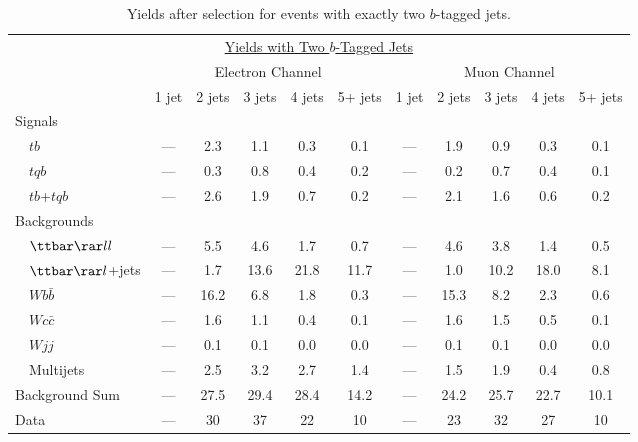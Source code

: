 \begin{table}[!h!tbp]
\begin{center}
\begin{minipage}{6.5in}
\begin{ruledtabular}
\begin{tabular}{l||ccccc|ccccc}
\multicolumn{11}{c}{\hspace{1in}\underline{Yields with Two $b$-Tagged Jets}} \vspace{0.1in} \\
& \multicolumn{5}{c|}{Electron Channel} & \multicolumn{5}{c}{Muon Channel} \\
                         & 1 jet & 2 jets & 3 jets & 4 jets & 5+ jets
                         & 1 jet & 2 jets & 3 jets & 4 jets & 5+ jets \\
\hline
Signals                  &      &       &       &       &      &      &       &       &       &       \\
~~$tb$                   &  --- &   2.3 &   1.1 &   0.3 &  0.1 &  --- &   1.9 &   0.9 &   0.3 &  0.1  \\
~~$tqb$                  &  --- &   0.3 &   0.8 &   0.4 &  0.2 &  --- &   0.2 &   0.7 &   0.4 &  0.1  \\
~~$tb$+$tqb$             &  --- &   2.6 &   1.9 &   0.7 &  0.2 &  --- &   2.1 &   1.6 &   0.6 &  0.2  \\
Backgrounds              &      &       &       &       &      &      &       &       &       &       \\
~~${\ttbar}{\rar}ll$     &  --- &   5.5 &   4.6 &   1.7 &  0.7 &  --- &   4.6 &   3.8 &   1.4 &  0.5  \\
~~${\ttbar}{\rar}l$+jets &  --- &   1.7 &  13.6 &  21.8 & 11.7 &  --- &   1.0 &  10.2 &  18.0 &  8.1  \\
~~$Wb\bar{b}$            &  --- &  16.2 &   6.8 &   1.8 &  0.3 &  --- &  15.3 &   8.2 &   2.3 &  0.6  \\
~~$Wc\bar{c}$            &  --- &   1.6 &   1.1 &   0.4 &  0.1 &  --- &   1.6 &   1.5 &   0.5 &  0.1  \\
~~$Wjj$                  &  --- &   0.1 &   0.1 &   0.0 &  0.0 &  --- &   0.1 &   0.1 &   0.0 &  0.0  \\
~~Multijets              &  --- &   2.5 &   3.2 &   2.7 &  1.4 &  --- &   1.5 &   1.9 &   0.4 &  0.8  \\
\hline 				       	       		      	     	     	     	     
Background Sum           &  --- &  27.5 &  29.4 &  28.4 & 14.2 &  --- &  24.2 &  25.7 &  22.7 & 10.1  \\
\hline			 	       	       		      	     	     	     	     
Data                     &  --- &   30  &   37  &   22  &  10  &  --- &   23  &   32  &   27  &  10  
\end{tabular}
\end{ruledtabular}
\vspace{-0.1in}
\caption[twotagyields]{Yields after selection for events with exactly two $b$-tagged jets.}
\label{twotag-yields}
\end{minipage}
\end{center}
\end{table}


